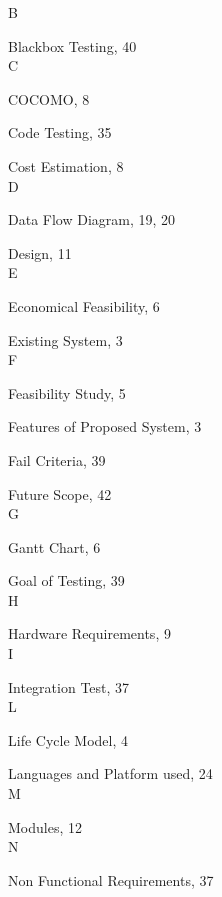 \documentclass[12pt,a4paper,oneside]{report}
\begin{document}
\begin{theindex}
\hspace{.6in}\large B
\small
\item Blackbox Testing, 40\\
\hspace{.6in}\large C
\small
\item COCOMO, 8
\item Code Testing, 35
\item Cost Estimation, 8\\
\hspace{.6in}\large D
\small
\item Data Flow Diagram, 19, 20
\item Design, 11\\
\hspace{.6in}\large E
\small
\item Economical Feasibility, 6
\item Existing System, 3\\
\hspace{.6in}\large F
\small
\item Feasibility Study, 5
\item Features of Proposed System, 3 
\item Fail Criteria, 39
\item Future Scope, 42\\
\hspace{.6in}\large G
\small
\item Gantt Chart, 6
\item Goal of Testing, 39\\
\hspace{.6in}\large H 
\small
\item Hardware Requirements, 9\\
\hspace{.6in}\large I
\small
\item Integration Test, 37\\
\hspace{.6in}\large L
\small
\item Life Cycle Model, 4
\item Languages and Platform used, 24\\
\hspace{.6in}\large M
\small
\item Modules, 12\\
\hspace{.6in}\large N
\small
\item Non Functional Requirements, 37\\

\end{theindex}
\end{document}
